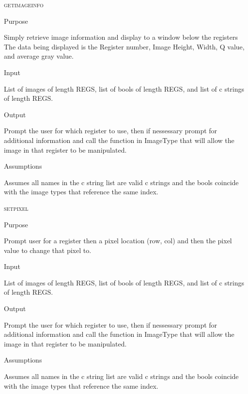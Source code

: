 \documentclass[pdftex, 11pt]{article}
\begin{document}
\begin{description}
	\item{\textsc{getimageinfo}}
		\begin{description}
			\item{Purpose}

				Simply retrieve image information and display to a window below the registers
				The data being displayed is the Register number, Image Height, Width, Q value,
				and average gray value.

			\item{Input}

				List of images of length REGS, list of bools of length
				REGS, and list of c strings of length REGS.

			\item{Output}

				Prompt the user for which register to use, then if nessessary
				prompt for additional information and call the function
				in ImageType that will allow the image in that register to
				be manipulated.

			\item{Assumptions}

				Assumes all names in the c string list are valid c
				strings and the bools coincide with the image types that
				reference the same index.

		\end{description}



	\item{\textsc{setpixel}}
		\begin{description}
			\item{Purpose}

				Prompt user for a register then a pixel location (row, col) and then the pixel
				value to change that pixel to.

			\item{Input}

				List of images of length REGS, list of bools of length
				REGS, and list of c strings of length REGS.

			\item{Output}

				Prompt the user for which register to use, then if nessessary
				prompt for additional information and call the function
				in ImageType that will allow the image in that register to
				be manipulated.

			\item{Assumptions}

				Assumes all names in the c string list are valid c
				strings and the bools coincide with the image types that
				reference the same index.


\end{description}
\end{description}
\end{document}

